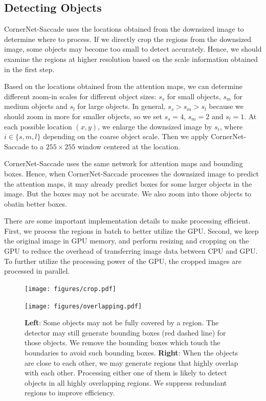 \documentclass{bmvc2k}
\begin{document}
\subsection{Detecting Objects}
CornerNet-Saccade uses the locations obtained from the downsized image to determine where to process. If we directly crop the regions from the downsized image, some objects may become too small to detect accurately. Hence, we should examine the regions at higher resolution based on the scale information obtained in the first step. 

Based on the locations obtained from the attention maps, we can determine different zoom-in scales for different object sizes: $s_s$ for small objects, $s_m$ for medium objects and $s_l$ for large objects. In general, $s_s > s_m > s_l$ because we should zoom in more for smaller objects, so we set $s_s = 4$, $s_m = 2$ and $s_l = 1$. At each possible location $(x, y)$, we enlarge the downsized image by $s_{i}$, where $i \in \{s, m, l\}$ depending on the coarse object scale. Then we apply CornerNet-Saccade to a $255 \times 255$ window centered at the location.

CornerNet-Saccade uses the same network for attention maps and bounding boxes. Hence, when CornerNet-Saccade processes the downsized image to predict the attention maps, it may already predict boxes for some larger objects in the image. But the boxes may not be accurate. We also zoom into those objects to obatin better boxes.

There are some important implementation details to make processing efficient. First, we process the regions in batch to better utilize the GPU. Second, we keep the original image in GPU memory, and perform resizing and cropping on the GPU to reduce the overhead of transferring image data between CPU and GPU. To further utilize the processing power of the GPU, the cropped images are processed in parallel.

\begin{figure}[t]
    \centering
    \begin{minipage}[t]{0.47\textwidth}
        \centering
        \texttt{[image: figures/crop.pdf]}
    \end{minipage}
    \hfill
    \begin{minipage}[t]{0.51\textwidth}
        \centering
        \texttt{[image: figures/overlapping.pdf]}
    \end{minipage}
    \caption{\textbf{Left}: Some objects may not be fully covered by a region. The detector may still generate bounding boxes (red dashed line) for those objects. We remove the bounding boxes which touch the boundaries to avoid such bounding boxes. \textbf{Right}: When the objects are close to each other, we may generate regions that highly overlap with each other. Processing either one of them is likely to detect objects in all highly overlapping regions. We suppress redundant regions to improve efficiency.}
    \label{fig:crop_and_overlap}
    \vspace{-3mm}
\end{figure}
\end{document}
